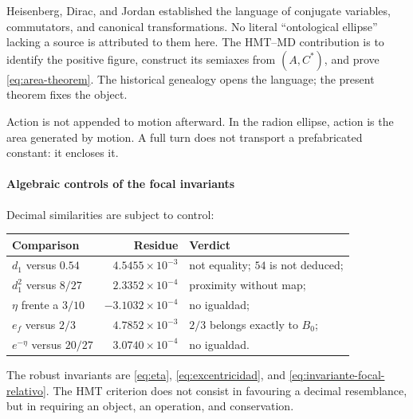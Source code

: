 Heisenberg, Dirac, and Jordan established the language of conjugate variables,
commutators, and canonical transformations. No literal
\enquote{ontological ellipse} lacking a source is attributed to them here. The HMT--MD contribution is
to identify the positive figure, construct its semiaxes from \((A,C^*)\), and
prove \eqref{eq:area-theorem}. The historical genealogy opens the language;
the present theorem fixes the object.

\begin{narrativebox}
Action is not appended to motion afterward. In the radion ellipse, action is the area generated by motion. A full turn does not transport a prefabricated constant: it encloses it.
\end{narrativebox}

\paragraph{Algebraic controls of the focal invariants}

Decimal similarities are subject to control:
\begin{center}
\begin{tabularx}{.96\textwidth}{l r X}
\toprule
Comparison & Residue & Verdict\\
\midrule
\(d_1\) versus \(0.54\) & \(4.5455\times10^{-3}\) & not equality; \(54\) is not deduced;\\
\(d_1^2\) versus \(8/27\) & \(2.3352\times10^{-4}\) & proximity without map;\\
\(\eta\) frente a \(3/10\) & \(-3.1032\times10^{-4}\) & no igualdad;\\
\(e_f\) versus \(2/3\) & \(4.7852\times10^{-3}\) & \(2/3\) belongs exactly to \(B_0\);\\
\(e^{-\eta}\) versus \(20/27\) & \(3.0740\times10^{-4}\) & no igualdad.\\
\bottomrule
\end{tabularx}
\end{center}
The robust invariants are \eqref{eq:eta}, \eqref{eq:excentricidad}, and
\eqref{eq:invariante-focal-relativo}. The HMT criterion does not consist in favouring
a decimal resemblance, but in requiring an object, an operation, and conservation.
